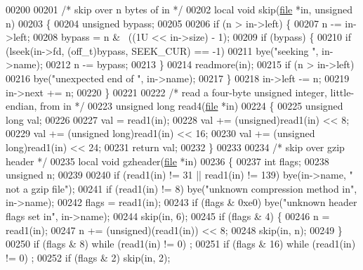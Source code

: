 \begin{DoxyCode}
{00200 
00201 \textcolor{comment}{/* skip over n bytes of in */}
00202 local \textcolor{keywordtype}{void} skip(\hyperlink{structfile}{file} *in, \textcolor{keywordtype}{unsigned} n)
00203 \{
00204     \textcolor{keywordtype}{unsigned} bypass;
00205 
00206     \textcolor{keywordflow}{if} (n > in->left) \{
00207         n -= in->left;
00208         bypass = n & ~((1U << in->size) - 1);
00209         \textcolor{keywordflow}{if} (bypass) \{
00210             \textcolor{keywordflow}{if} (lseek(in->fd, (off\_t)bypass, SEEK\_CUR) == -1)
00211                 bye(\textcolor{stringliteral}{"seeking "}, in->name);
00212             n -= bypass;
00213         \}
00214         readmore(in);
00215         \textcolor{keywordflow}{if} (n > in->left)
00216             bye(\textcolor{stringliteral}{"unexpected end of "}, in->name);
00217     \}
00218     in->left -= n;
00219     in->next += n;
00220 \}
00221 
00222 \textcolor{comment}{/* read a four-byte unsigned integer, little-endian, from in */}
00223 \textcolor{keywordtype}{unsigned} \textcolor{keywordtype}{long} read4(\hyperlink{structfile}{file} *in)
00224 \{
00225     \textcolor{keywordtype}{unsigned} \textcolor{keywordtype}{long} val;
00226 
00227     val = read1(in);
00228     val += (unsigned)read1(in) << 8;
00229     val += (\textcolor{keywordtype}{unsigned} long)read1(in) << 16;
00230     val += (\textcolor{keywordtype}{unsigned} long)read1(in) << 24;
00231     \textcolor{keywordflow}{return} val;
00232 \}
00233 
00234 \textcolor{comment}{/* skip over gzip header */}
00235 local \textcolor{keywordtype}{void} gzheader(\hyperlink{structfile}{file} *in)
00236 \{
00237     \textcolor{keywordtype}{int} flags;
00238     \textcolor{keywordtype}{unsigned} n;
00239 
00240     \textcolor{keywordflow}{if} (read1(in) != 31 || read1(in) != 139) bye(in->name, \textcolor{stringliteral}{" not a gzip file"});
00241     \textcolor{keywordflow}{if} (read1(in) != 8) bye(\textcolor{stringliteral}{"unknown compression method in"}, in->name);
00242     flags = read1(in);
00243     \textcolor{keywordflow}{if} (flags & 0xe0) bye(\textcolor{stringliteral}{"unknown header flags set in"}, in->name);
00244     skip(in, 6);
00245     \textcolor{keywordflow}{if} (flags & 4) \{
00246         n = read1(in);
00247         n += (unsigned)(read1(in)) << 8;
00248         skip(in, n);
00249     \}
00250     \textcolor{keywordflow}{if} (flags & 8) \textcolor{keywordflow}{while} (read1(in) != 0) ;
00251     \textcolor{keywordflow}{if} (flags & 16) \textcolor{keywordflow}{while} (read1(in) != 0) ;
00252     \textcolor{keywordflow}{if} (flags & 2) skip(in, 2);
}
\end{DoxyCode}
